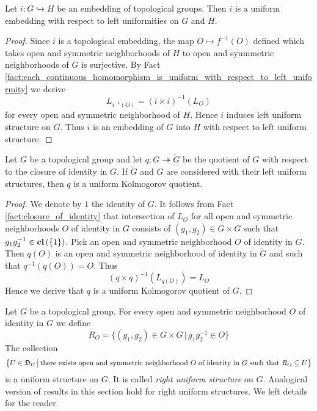 \documentclass[10pt]{amsart}
\begin{document}
\begin{corollary}\label{corollary:topological_groups_embeddings_is_uniform_embedding}
	Let $i:G\hookrightarrow H$ be an embedding of topological groups. Then $i$ is a uniform embedding with respect to left uniformities on $G$ and $H$.
\end{corollary}
\begin{proof}
	Since $i$ is a topological embedding, the map $O\mapsto f^{-1}(O)$ defined which takes open and symmetric neighborhoods of $H$ to open and syummetric neighborhoods of $G$ is surjective. By Fact \ref{fact:each_continuous_homomorphism_is_uniform_with_respect_to_left_uniformity} we derive
	$$L_{i^{-1}(O)} = \left(i\times i\right)^{-1}(L_O)$$
	for every open and symmetric neighborhood of $H$. Hence $i$ induces left uniform structure on $G$. Thus $i$ is an embedding of $G$ into $H$ with respect to left uniform structure.
\end{proof}

\begin{corollary}\label{corollary:uniform_Kolmogorov_quotients_of_topological_groups}
	Let $G$ be a topological group and let $q:G\twoheadrightarrow \tilde{G}$ be the quotient of $G$ with respect to the closure of identity in $G$. If $\tilde{G}$ and $G$ are considered with their left uniform structures, then $q$ is a uniform Kolmogorov quotient.
\end{corollary}
\begin{proof}
	We denote by $1$ the identity of $G$. It follows from Fact \ref{fact:closure_of_identity} that intersection of $L_O$ for all open and symmetric neighborhoods $O$ of identity in $G$ consists of $(g_1,g_2) \in G\times G$ such that $g_1g_2^{-1} \in \mathbf{cl}\left(\{1\}\right)$. Pick an open and symmetric neighborhood $O$ of identity in $G$. Then $q(O)$ is an open and symmetric neighborhood of identity in $\tilde{G}$ and such that $q^{-1}(q(O)) = O$. Thus
	$$\left(q \times q\right)^{-1}(L_{q(O)}) = L_O$$
	Hence we derive that $q$ is a uniform Kolmogorov quotient of $G$.
\end{proof}

\begin{remark}\label{remark:right_uniform_structure}
	Let $G$ be a topological group. For every open and symmetric neighborhood $O$ of identity in $G$ we define
	$$R_O = \big\{(g_1,g_2)\in G\times G\,\big|\,g_1g_2^{-1} \in O\big\}$$
	The collection
	$$\big\{U \in {\mathfrak D}_G\,\big|\,\mbox{there exists open and symmetric neighborhood }O\mbox{ of identity in }G\mbox{ such that }R_O\subseteq U\big\}$$
	is a uniform structure on $G$. It is called \textit{right uniform structure} on $G$. Analogical version of results in this section hold for right uniform structures. We left details for the reader.
\end{remark}
\end{document}
